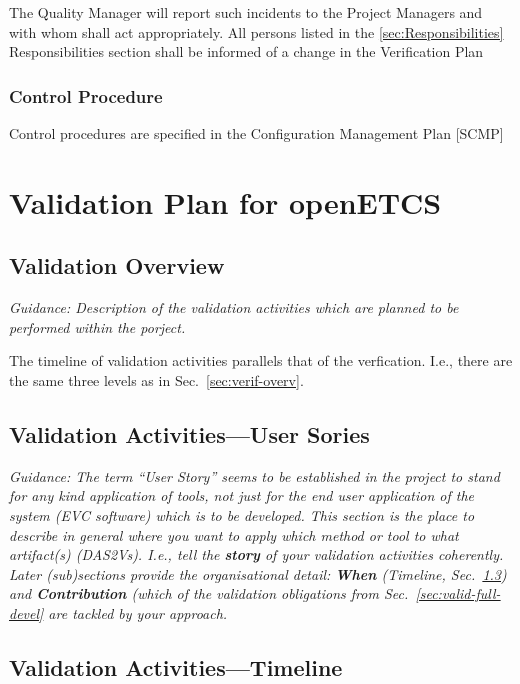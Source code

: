 \documentclass{template/openetcs_report}
\begin{document}
The Quality Manager will report such incidents to the Project Managers
and with whom shall act appropriately. All persons listed in the
\ref{sec:Responsibilities} Responsibilities section shall be informed
of a change in the Verification Plan 

\subsubsection{Control Procedure}
Control procedures are specified in the Configuration Management Plan [SCMP]

\section{Validation Plan for openETCS}
\label{sec:valid-plan-open}

\subsection{Validation Overview}
\label{sec:valid-overv}
\textit{Guidance: Description of the validation activities which are
  planned to be performed within the porject. }

The timeline of validation activities parallels that of the
verfication. I.e., there are the same three levels as in
Sec.~\ref{sec:verif-overv}. 


\subsection{Validation Activities---User Sories}
\label{sec:valid-activ-user}

\emph{Guidance: The term ``User Story'' seems to be established in the
project to stand for any kind application of tools, not just for the
end user application of the system (EVC software) which is to be
developed. This section is the place to describe in general where you
want to apply which method or tool to what artifact(s) (DAS2Vs). I.e.,
tell the \textbf{story} of your validation activities coherently. Later
(sub)sections provide the organisational detail: \textbf{When} (Timeline,
Sec.~\ref{sec:valid-activ-timel}) and 
\textbf{Contribution} (which of the validation obligations from
Sec.~\ref{sec:valid-full-devel} are tackled by your approach.}


\subsection{Validation Activities---Timeline}
\label{sec:valid-activ-timel}
\end{document}
